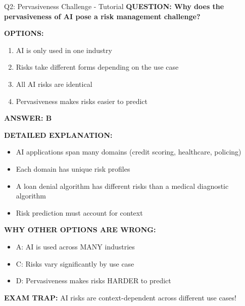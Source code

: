 \documentclass[8pt]{beamer}
\begin{document}
	\begin{frame}{Q2: Pervasiveness Challenge - Tutorial}
		\fontsize{6.5}{7.5}\selectfont
		\textbf{QUESTION: Why does the pervasiveness of AI pose a risk management challenge?}
		
		\vspace{0.1cm}
		\textbf{OPTIONS:}
		\begin{enumerate}
			\item AI is only used in one industry
			\item Risks take different forms depending on the use case
			\item All AI risks are identical
			\item Pervasiveness makes risks easier to predict
		\end{enumerate}
		
		\vspace{0.1cm}
		\textcolor{myblue}{\textbf{ANSWER: B}}
		
		\vspace{0.1cm}
		\textbf{DETAILED EXPLANATION:}
		\begin{itemize}
			\item AI applications span many domains (credit scoring, healthcare, policing)
			\item Each domain has unique risk profiles
			\item A loan denial algorithm has different risks than a medical diagnostic algorithm
			\item Risk prediction must account for context
		\end{itemize}
		
		\vspace{0.1cm}
		\textcolor{myred}{\textbf{WHY OTHER OPTIONS ARE WRONG:}}
		\begin{itemize}
			\item \textcolor{myred}{A:} AI is used across MANY industries
			\item \textcolor{myred}{C:} Risks vary significantly by use case
			\item \textcolor{myred}{D:} Pervasiveness makes risks HARDER to predict
		\end{itemize}
		
		\textcolor{myred}{\textbf{EXAM TRAP:}} AI risks are \textcolor{myblue}{context-dependent} across different use cases!
	\end{frame}
	
\end{document}
